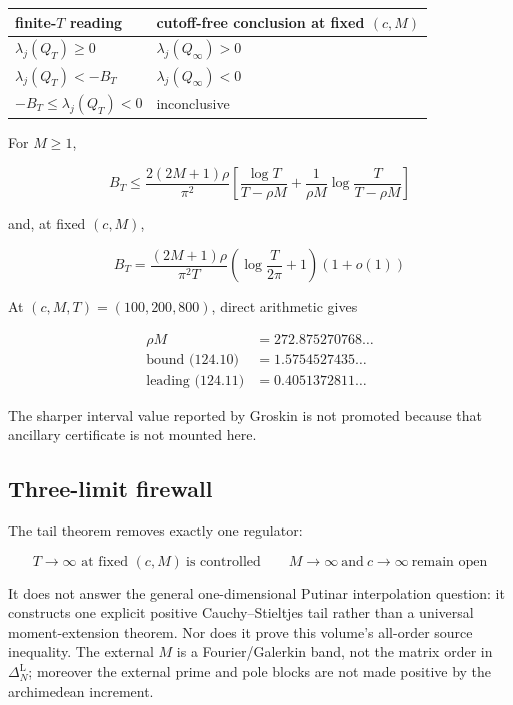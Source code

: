 \documentclass[
  11pt,
]{book}
\begin{document}
\begin{longtable}[]{@{}ll@{}}
\toprule\noalign{}
finite-\(T\) reading & cutoff-free conclusion at fixed \((c,M)\) \\
\midrule\noalign{}
\endhead
\bottomrule\noalign{}
\endlastfoot
\(\lambda_j(Q_T)\ge0\) & \(\lambda_j(Q_\infty)>0\) \\
\(\lambda_j(Q_T)<-B_T\) & \(\lambda_j(Q_\infty)<0\) \\
\(-B_T\le\lambda_j(Q_T)<0\) & inconclusive \\
\end{longtable}

For \(M\ge1\),

\[
B_T\le
\frac{2(2M+1)\rho}{\pi^2}
\left[
\frac{\log T}{T-\rho M}
+\frac1{\rho M}\log\frac{T}{T-\rho M}
\right]
\tag{124.10}
\]

and, at fixed \((c,M)\),

\[
B_T=
\frac{(2M+1)\rho}{\pi^2T}
\left(\log\frac{T}{2\pi}+1\right)(1+o(1))
\tag{124.11}
\]

At \((c,M,T)=(100,200,800)\), direct arithmetic gives

\[
\begin{aligned}
\rho M&=272.875270768\ldots\\
\text{bound (124.10)}&=1.5754527435\ldots\\
\text{leading (124.11)}&=0.4051372811\ldots
\end{aligned}
\tag{124.12}
\]

The sharper interval value reported by Groskin is not promoted because
that ancillary certificate is not mounted here.

\subsection{Three-limit firewall}\label{three-limit-firewall}

The tail theorem removes exactly one regulator:

\[
\boxed{
T\to\infty\text{ at fixed }(c,M)\ \text{is controlled}
\qquad
M\to\infty\ \text{and}\ c\to\infty\ \text{remain open}
}
\tag{124.13}
\]

It does not answer the general one-dimensional Putinar interpolation
question: it constructs one explicit positive Cauchy--Stieltjes tail
rather than a universal moment-extension theorem. Nor does it prove this
volume's all-order source inequality. The external \(M\) is a
Fourier/Galerkin band, not the matrix order in \(\Delta_N^{\mathrm L}\);
moreover the external prime and pole blocks are not made positive by the
archimedean increment.
\end{document}
